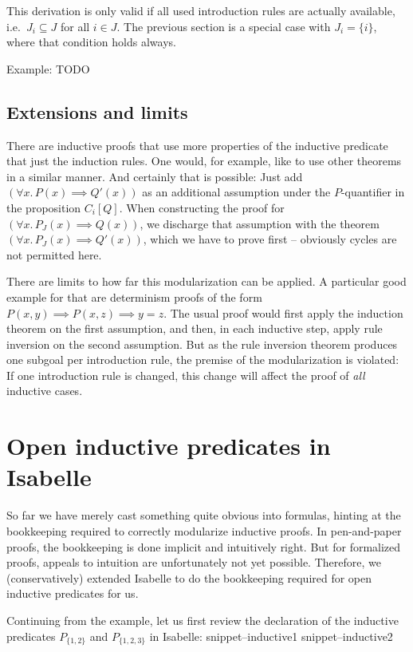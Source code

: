 \documentclass{llncs}
\newcommand{\Snippet}[1]{\csname snippet--#1\endcsname}
\begin{document}
This derivation is only valid if all used introduction rules are actually available, i.e.\ $J_i \subseteq J$ for all $i\in J$.  The previous section is a special case with $J_i=\{i\}$, where that condition holds always.


Example: TODO

\subsection{Extensions and limits}

There are inductive proofs that use more properties of the inductive predicate that just the induction rules. One would, for example, like to use other theorems in a similar manner. And certainly that is possible: Just add $(\forall x.\, P(x) \implies Q'(x))$ as an additional assumption under the $P$-quantifier in the proposition $C_i[Q]$. When constructing the proof for $(\forall x.\, P_J(x) \implies Q(x))$, we discharge that assumption with the theorem $(\forall x.\, P_J(x) \implies Q'(x))$, which we have to prove first -- obviously cycles are not permitted here.

There are limits to how far this modularization can be applied. A particular good example for that are determinism proofs of the form $P(x,y) \implies P(x,z) \implies y = z$. The usual proof would first apply the induction theorem on the first assumption, and then, in each inductive step, apply rule inversion on the second assumption. But as the rule inversion theorem produces one subgoal per introduction rule, the premise of the modularization is violated: If one introduction rule is changed, this change will affect the proof of \emph{all} inductive cases. 


\section{Open inductive predicates in Isabelle}

So far we have merely cast something quite obvious into formulas, hinting at the bookkeeping required to correctly modularize inductive proofs. In pen-and-paper proofs, the bookkeeping is done implicit and intuitively right. But for formalized proofs, appeals to intuition are unfortunately not yet possible. Therefore, we (conservatively) extended Isabelle to do the bookkeeping required for open inductive predicates for us.

Continuing from the example, let us first review the declaration of the inductive predicates $P_{\{1,2\}}$ and $P_{\{1,2,3\}}$ in Isabelle:
\Snippet{inductive1}
\Snippet{inductive2}
\end{document}
